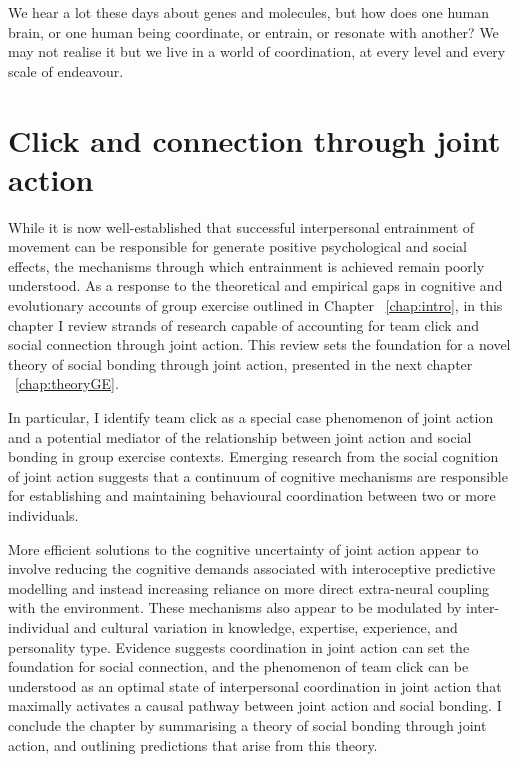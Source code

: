 
\begin{savequote}[8cm]

    We hear a lot these days about genes and molecules, but how does one human brain, or one human being coordinate, or entrain, or resonate with another?  We may not realise it but we live in a world of coordination, at every level and every scale of endeavour.

\end{savequote}




\chapter{\label{chap:theory}Click and connection through joint action}

\minitoc

While it is now well-established that successful interpersonal entrainment of movement can be responsible for generate positive psychological and social effects, the mechanisms through which entrainment is achieved remain poorly understood.  As a response to the theoretical and empirical gaps in cognitive and evolutionary accounts of group exercise outlined in Chapter ~\ref{chap:intro}, in this chapter I review strands of research capable of accounting for team click and social connection through joint action.  This review sets the foundation for a novel theory of social bonding through joint action, presented in the next chapter ~\ref{chap:theoryGE}.

 In particular, I identify team click as a special case phenomenon of joint action and a potential mediator of the relationship between joint action and social bonding in group exercise contexts.  Emerging research from the social cognition of joint action suggests that a continuum of cognitive mechanisms are responsible for establishing and maintaining behavioural coordination between two or more individuals.

More efficient solutions to the cognitive uncertainty of joint action appear to involve reducing the cognitive demands associated with interoceptive predictive modelling and instead increasing reliance on more direct extra-neural coupling with the environment.  These mechanisms also appear to be modulated by inter-individual and cultural variation in knowledge, expertise, experience, and personality type.  Evidence suggests coordination in joint action can set the foundation for social connection, and the phenomenon of team click can be understood as an optimal state of interpersonal coordination in joint action that maximally activates a causal pathway between joint action and social bonding.  I conclude the chapter by summarising a theory of social bonding through joint action, and outlining predictions that arise from this theory.

